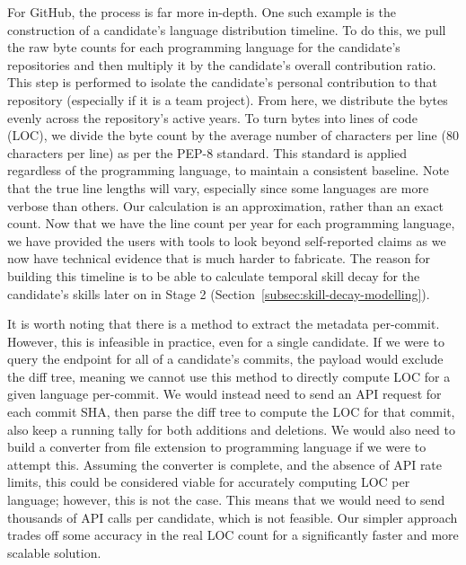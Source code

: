 For GitHub, the process is far more in-depth. One such example is the construction of a candidate's language distribution timeline. To do this,
we pull the raw byte counts for each programming language for the candidate's repositories and then multiply it by the candidate's overall contribution ratio.
This step is performed to isolate the candidate's personal contribution to that repository (especially if it is a team project). From here, we distribute the bytes
evenly across the repository's active years. To turn bytes into lines of code (LOC), we divide the byte count by the average number of characters per line 
(80 characters per line) as per the PEP-8 standard. This standard is applied regardless of the programming language, to maintain a consistent baseline.
Note that the true line lengths will vary, especially since some languages are more verbose than others. Our calculation is an approximation, rather
than an exact count. Now that we have the line count per year for each programming language, we have provided the users with tools to look
beyond self-reported claims as we now have technical evidence that is much harder to fabricate. The reason for building this timeline is to be able to  
calculate temporal skill decay for the candidate's skills later on in Stage 2 (Section~\ref{subsec:skill-decay-modelling}).

It is worth noting that there is a method to extract the metadata per-commit. However, this is infeasible in practice, even for a single candidate.
If we were to query the endpoint for all of a candidate's commits, the payload would exclude the diff tree, meaning we cannot use this method to directly compute 
LOC for a given language per-commit. We would instead need to send an API request for each commit SHA, then parse the diff tree to compute the LOC for that commit,
also keep a running tally for both additions and deletions. We would also need to build a converter from file extension to programming language
if we were to attempt this. Assuming the converter is complete, and the absence of API rate limits, this could be considered viable for accurately computing
LOC per language; however, this is not the case. This means that we would need to send thousands of API calls per candidate, which is not feasible. 
Our simpler approach trades off some accuracy in the real LOC count for a significantly faster and more scalable solution.

